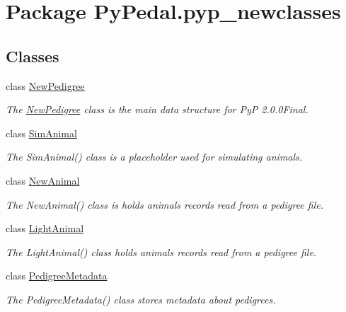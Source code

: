 \hypertarget{namespacePyPedal_1_1pyp__newclasses}{
\section{Package Py\-Pedal.pyp\_\-newclasses}
\label{namespacePyPedal_1_1pyp__newclasses}
}


\subsection*{Classes}
\begin{CompactItemize}
\item 
class \hyperlink{classPyPedal_1_1pyp__newclasses_1_1NewPedigree}{New\-Pedigree}
\begin{CompactList}\small\item\em The \hyperlink{classPyPedal_1_1pyp__newclasses_1_1NewPedigree}{New\-Pedigree} class is the main data structure for Py\-P 2.0.0Final. \item\end{CompactList}\item 
class \hyperlink{classPyPedal_1_1pyp__newclasses_1_1SimAnimal}{Sim\-Animal}
\begin{CompactList}\small\item\em The Sim\-Animal() class is a placeholder used for simulating animals. \item\end{CompactList}\item 
class \hyperlink{classPyPedal_1_1pyp__newclasses_1_1NewAnimal}{New\-Animal}
\begin{CompactList}\small\item\em The New\-Animal() class is holds animals records read from a pedigree file. \item\end{CompactList}\item 
class \hyperlink{classPyPedal_1_1pyp__newclasses_1_1LightAnimal}{Light\-Animal}
\begin{CompactList}\small\item\em The Light\-Animal() class holds animals records read from a pedigree file. \item\end{CompactList}\item 
class \hyperlink{classPyPedal_1_1pyp__newclasses_1_1PedigreeMetadata}{Pedigree\-Metadata}
\begin{CompactList}\small\item\em The Pedigree\-Metadata() class stores metadata about pedigrees. \item\end{CompactList}\item 

\end{CompactItemize}
